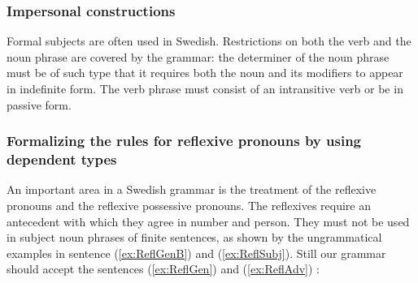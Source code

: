 \documentclass[runningheads,a4paper]{llncs}
\begin{document}
\subsubsection{Impersonal constructions}
\label{sec:Formal}
Formal subjects \cite[]{SAG} are often used in Swedish.
Restrictions on both the verb and the noun phrase are covered by the grammar:
the determiner of the
noun phrase must be of such type that it requires both the noun and its modifiers
to appear in indefinite form. The verb phrase must consist of an intransitive verb
or be in passive form.

\subsubsection{Formalizing the rules for reflexive pronouns by using dependent types}
\label{sec:reflexives}
An important area in a Swedish grammar is the treatment of the reflexive pronouns and
the reflexive possessive pronouns.
The reflexives require an antecedent with which they agree in
number and person. They must 
not be used in subject noun phrases of finite sentences,
as shown by the ungrammatical examples in 
sentence (\ref{ex:ReflGenB}) and (\ref{ex:ReflSubj}).
Still our grammar should accept the sentences (\ref{ex:ReflGen})
and (\ref{ex:ReflAdv}) :
\end{document}
